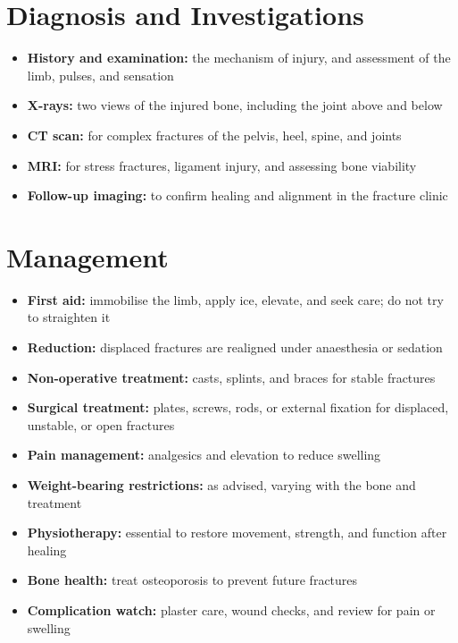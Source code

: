 \section*{Diagnosis and Investigations}
\begin{itemize}
    \item \textbf{History and examination:} the mechanism of injury, and assessment of the limb, pulses, and sensation
    \item \textbf{X-rays:} two views of the injured bone, including the joint above and below
    \item \textbf{CT scan:} for complex fractures of the pelvis, heel, spine, and joints
    \item \textbf{MRI:} for stress fractures, ligament injury, and assessing bone viability
    \item \textbf{Follow-up imaging:} to confirm healing and alignment in the fracture clinic
\end{itemize}

\section*{Management}
\begin{itemize}
    \item \textbf{First aid:} immobilise the limb, apply ice, elevate, and seek care; do not try to straighten it
    \item \textbf{Reduction:} displaced fractures are realigned under anaesthesia or sedation
    \item \textbf{Non-operative treatment:} casts, splints, and braces for stable fractures
    \item \textbf{Surgical treatment:} plates, screws, rods, or external fixation for displaced, unstable, or open fractures
    \item \textbf{Pain management:} analgesics and elevation to reduce swelling
    \item \textbf{Weight-bearing restrictions:} as advised, varying with the bone and treatment
    \item \textbf{Physiotherapy:} essential to restore movement, strength, and function after healing
    \item \textbf{Bone health:} treat osteoporosis to prevent future fractures
    \item \textbf{Complication watch:} plaster care, wound checks, and review for pain or swelling
\end{itemize}

